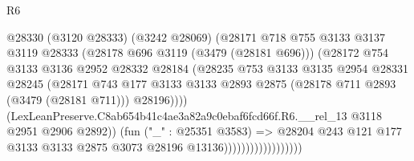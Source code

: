 \begin{lexlean}{R6}
\begin{coremodule}
                                      @28330
                                        (@3120 @28333)
                                        (@3242 @28069)
                                        (@28171
                                          @718
                                          @755
                                          @3133
                                          @3137
                                          @3119
                                          @28333
                                          (@28178 @696 @3119 (@3479 (@28181 @696)))
                                          (@28172
                                            @754
                                            @3133
                                            @3136
                                            @2952
                                            @28332
                                            @28184
                                            (@28235
                                              @753
                                              @3133
                                              @3135
                                              @2954
                                              @28331
                                              @28245
                                              (@28171
                                                @743
                                                @177
                                                @3133
                                                @3133
                                                @2893
                                                @2875
                                                (@28178 @711 @2893 (@3479 (@28181 @711)))
                                                @28196))))
                                        (LexLeanPreserve.C8ab654b41c4ae3a82a9c0ebaf6fcd66f.R6.__rel_13
                                          @3118
                                          @2951
                                          @2906
                                          @2892))
                                      (fun ("_" : @25351 @3583) =>
                                      @28204
                                        @243
                                        @121
                                        @177
                                        @3133
                                        @3133
                                        @2875
                                        @3073
                                        @28196
                                        @13136))))))))))))))))))

\end{coremodule}
\end{lexlean}
